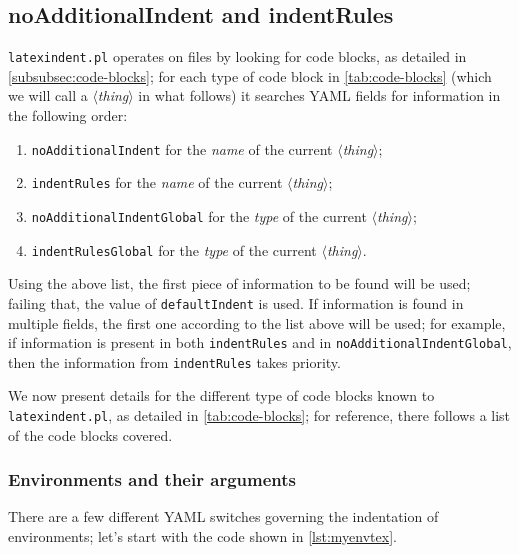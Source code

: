 \documentclass[10pt]{article}
\begin{document}
\subsection{noAdditionalIndent and indentRules}\label{sec:noadd-indent-rules}
 \texttt{latexindent.pl} operates on files by looking for code blocks, as detailed in
 \vref{subsubsec:code-blocks};
 for each type of code block in \vref{tab:code-blocks} (which we will call a
 \emph{$\langle$thing$\rangle$} in what follows) it searches YAML fields for information
 in the following order:
 \begin{enumerate}
  \item \texttt{noAdditionalIndent} for the \emph{name} of the current
        \emph{$\langle$thing$\rangle$};
  \item \texttt{indentRules} for the \emph{name} of the current \emph{$\langle$thing$\rangle$};
  \item \texttt{noAdditionalIndentGlobal} for the \emph{type} of the current
        \emph{$\langle$thing$\rangle$};
  \item \texttt{indentRulesGlobal} for the \emph{type} of the current
        \emph{$\langle$thing$\rangle$}.
 \end{enumerate}

 Using the above list, the first piece of information to be found will be used; failing
 that, the value of \texttt{defaultIndent} is used. If information is found in multiple
 fields, the first one according to the list above will be used; for example, if
 information is present in both \texttt{indentRules} and in
 \texttt{noAdditionalIndentGlobal}, then the information from \texttt{indentRules} takes
 priority.

 We now present details for the different type of code blocks known to
 \texttt{latexindent.pl}, as detailed in \vref{tab:code-blocks}; for reference, there
 follows a list of the code blocks covered.

 \startcontents[noAdditionalIndent]
\subsubsection{Environments and their arguments}\label{subsubsec:env-and-their-args}
 There are a few different YAML switches governing the indentation of environments; let's
 start with the code shown in \cref{lst:myenvtex}.

\end{document}
